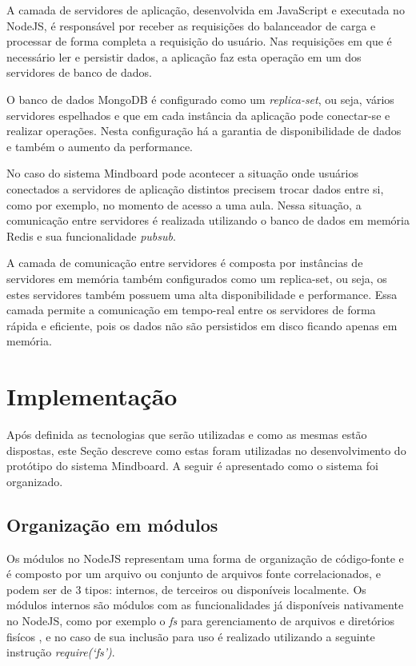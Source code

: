A camada de servidores de aplicação, desenvolvida em JavaScript e executada no NodeJS, é responsável por receber as requisições do balanceador de carga e processar de forma completa a requisição do usuário. Nas requisições em que é necessário ler e persistir dados, a aplicação faz esta operação em um dos servidores de banco de dados. 

O banco de dados MongoDB é configurado como um \emph{replica-set}, ou seja, vários servidores espelhados e que em cada instância da aplicação pode conectar-se e realizar operações. Nesta configuração há a garantia de disponibilidade de dados e também o aumento da performance.

No caso do sistema Mindboard pode acontecer a situação onde usuários conectados a servidores de aplicação distintos precisem trocar dados entre si, como por exemplo, no momento de acesso a uma aula. Nessa situação, a comunicação entre servidores é realizada utilizando o banco de dados em memória Redis e sua funcionalidade \emph{pubsub}.

A camada de comunicação entre servidores é composta por instâncias de servidores em memória também configurados como um replica-set, ou seja, os estes servidores também possuem uma alta disponibilidade e performance. Essa camada permite a comunicação em tempo-real entre os servidores de forma rápida e eficiente, pois os dados não são persistidos em disco ficando apenas em memória.


\section{Implementação}
\label{sec:implementacao}

Após definida as tecnologias que serão utilizadas e como as mesmas estão dispostas, este Seção descreve como estas foram utilizadas no desenvolvimento do protótipo do sistema Mindboard. A seguir é apresentado como o sistema foi organizado.


\subsection{Organização em módulos}
\label{sec:organizacao_mods}

Os módulos no NodeJS representam uma forma de organização de código-fonte e é composto por um arquivo ou conjunto de arquivos fonte correlacionados, e podem ser de 3 tipos: internos, de terceiros ou disponíveis localmente. Os módulos internos são módulos com as funcionalidades já disponíveis nativamente no NodeJS, como por exemplo o \emph{fs} para gerenciamento de arquivos e diretórios fisícos \cite{node_modules}, e no caso de sua inclusão para uso é realizado utilizando a seguinte instrução \emph{require(`fs')}.

